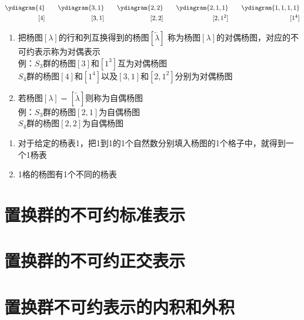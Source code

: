 \begin{example}[$S_4$ 群的杨图从大到小排列为]
	\begin{equation}\begin{aligned}
	\ydiagram{4}&\quad&\ydiagram{3,1}&\quad&\ydiagram{2,2}&\quad&\ydiagram{2,1,1}&\quad&\ydiagram{1,1,1,1}\\
	[4]&\quad&[3,1]&\quad&[2,2]&\quad&[2,1^2]&\quad&[1^4]
	\end{aligned}\end{equation}
\end{example}


\begin{note}
	\begin{enumerate}
		\item 
		把杨图$[\lambda]$的行和列互换得到的杨图$[\tilde{\lambda}]$
		称为杨图$[\lambda]$的{\color{seco}对偶杨图}，对应的不可约表示称为对偶表示\\
		例：$S_3$群的杨图$[3]$和$[1^3]$互为对偶杨图\\
		\phantom{例：}$S_4$群的杨图$[4]$和$[1^4]$以及$[3,1]$和$[2,1^2]$分别为对偶杨图
		\item 
		若杨图$[\lambda]=[\tilde{\lambda}]$则称为自偶杨图\\
		例：$S_3$群的杨图$[2,1]$为自偶杨图\\
		\phantom{例：}$S_4$群的杨图$[2,2]$为自偶杨图
	\end{enumerate}
\end{note}


\begin{newdef}[杨表]
\begin{enumerate}
	\item 
	对于给定的杨表1，把1到1的1个自然数分别填入杨图的1个格子中，就得到一个1杨表
	\item 1格的杨图有1个不同的杨表
\end{enumerate}
\end{newdef}










\section{置换群的不可约标准表示}


\section{置换群的不可约正交表示}


\section{置换群不可约表示的内积和外积}














